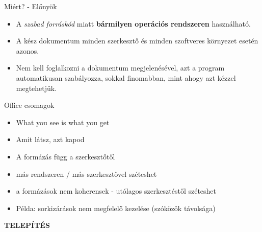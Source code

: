 \documentclass[11pt]{beamer}
\begin{document}
\begin{frame}{Miért? - Előnyök}
\begin{itemize}
\item A \textit{szabad forráskód} miatt \textbf{bármilyen operációs rendszeren} használható.
\item A kész dokumentum minden szerkesztő és minden szoftveres környezet esetén azonos.
\item Nem kell foglalkozni a dokumentum megjelenésével, azt a program automatikusan szabályozza, sokkal finomabban, mint ahogy azt kézzel megtehetjük.
\end{itemize}
\end{frame}

\begin{frame}{Office csomagok}
\begin{itemize}
\item What you see is what you get
\item Amit látsz, azt kapod
\item A formázás függ a szerkesztőtől
\item más rendszeren / más szerkesztővel széteshet
\item a formázások nem koherensek - utólagos szerkesztéstől széteshet
\item Példa: sorkizárások nem megfelelő kezelése (szóközök távolsága)
\end{itemize}
\end{frame}

\begin{frame}
\begin{center}
{\Huge \textbf{TELEPÍTÉS}}
\end{center}
\end{frame}
\end{document}
